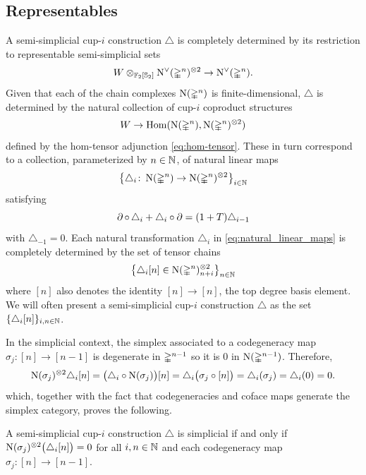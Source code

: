 \subsection{Representables}\label{ss:naturality}

A semi-simplicial \mbox{cup-$i$} construction $\triangle$ is completely determined by its restriction to representable semi-simplicial sets
\[
W \ot_{\Ftwo[\Sym_2]} \cochains(\simplex^n)^{\ot 2} \to \cochains(\simplex^n).
\]
Given that each of the chain complexes $\chains(\simplex^n)$ is finite-dimensional, $\triangle$ is determined by the natural collection of cup-$i$ coproduct structures
\[
W \to \Hom(\chains(\simplex^n), \chains(\simplex^n)^{\ot 2})
\]
defined by the hom-tensor adjunction \eqref{eq:hom-tensor}.
These in turn correspond to a collection, parameterized by $n \in \N$, of natural linear maps
\begin{equation}\label{eq:natural_linear_maps}
	\set[\big]{\triangle_i \colon \chains(\simplex^n) \to \chains(\simplex^n)^{\ot 2}}_{i \in \N}
\end{equation}
satisfying
\[
\bd \circ \, \triangle_i + \triangle_i \circ \bd =
(1+T) \triangle_{i-1}
\]
with $\triangle_{-1} = 0$.
Each natural transformation $\triangle_i$ in \eqref{eq:natural_linear_maps} is completely determined by the set of tensor chains
\[
\set[\big]{\triangle_i[n] \in \chains(\simplex^n)^{\ot 2}_{n+i}}_{n\in\N}
\]
where $[n]$ also denotes the identity $[n] \to [n]$, the top degree basis element.
We will often present a semi-simplicial \mbox{cup-$i$} construction $\triangle$ as the set $\set{\triangle_i[n]}_{i,n\in\N}$.

\medskip In the simplicial context, the simplex associated to a codegeneracy map $\sigma_j \colon [n] \to [n-1]$ is degenerate in $\simplex^{n-1}$ so it is $0$ in $\chains(\simplex^{n-1})$.
Therefore,
\[
\chains(\sigma_j)^{\ot 2} \triangle_i[n] = \big( \triangle_i \circ \chains(\sigma_j) \big)[n] = \triangle_i \big( \sigma_j \circ [n] \big) = \triangle_i(\sigma_j) = \triangle_i(0) = 0.
\]
which, together with the fact that codegeneracies and coface maps generate the simplex category, proves the following.

\begin{lemma}\label{l:simplicial_from_semisimplicial}
	A semi-simplicial \mbox{cup-$i$} construction $\triangle$ is simplicial if and only if $\chains(\sigma_j)^{\ot 2}\big(\triangle_i[n]\big) = 0$ for all $i,n\in\N$ and each codegeneracy map $\sigma_j \colon [n] \to [n-1]$.
\end{lemma}

